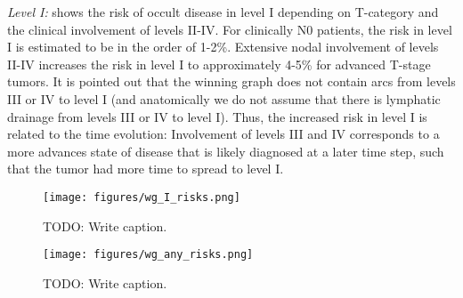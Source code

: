 \documentclass[twocolumn]{aastex631}
\begin{document}
\begin{figure}
\end{figure}

{\it Level I:}  shows the risk of occult disease in level I depending on T-category and the clinical involvement of levels II-IV. For clinically N0 patients, the risk in level I is estimated to be in the order of 1-2\%. Extensive nodal involvement of levels II-IV increases the risk in level I to approximately 4-5\% for advanced T-stage tumors. It is pointed out that the winning graph does not contain arcs from levels III or IV to level I (and anatomically we do not assume that there is lymphatic drainage from levels III or IV to level I). Thus, the increased risk in level I is related to the time evolution: Involvement of levels III and IV corresponds to a more advances state of disease that is likely diagnosed at a later time step, such that the tumor had more time to spread to level I.

\begin{figure}
    \begin{centering}
        \texttt{[image: figures/wg\_I\_risks.png]}
        \caption{TODO: Write caption.}
        \label{fig:wg_I_risks}
    \end{centering}
\end{figure}


\begin{figure}
    \begin{centering}
        \texttt{[image: figures/wg\_any\_risks.png]}
        \caption{TODO: Write caption.}
        \label{fig:wg_any_risks}
    \end{centering}
\end{figure}
\end{document}

